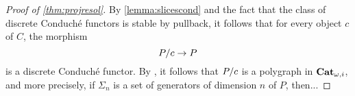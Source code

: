 \begin{proof}[Proof of \cref{thm:projresol}]
By \cref{lemma:slicescond} and the fact that the class of discrete Conduché functors is
stable by pullback, it follows that for every object $c$ of $C$, the
morphism
\[
  P/c \to P
\]
is a discrete Conduché functor. By , it follows that
$P/c$ is a polygraph in $\mathbf{Cat}_{\omega,i}$, and more precisely, if
$\Sigma_n$ is a set of generators of dimension $n$ of $P$, then...
\end{proof}

